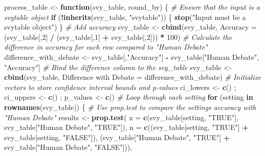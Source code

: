 \documentclass[
]{article}
\newenvironment{Shaded}{\begin{snugshade}}{\end{snugshade}}
\newcommand{\AttributeTok}[1]{\textcolor[rgb]{0.13,0.29,0.53}{#1}}
\newcommand{\CommentTok}[1]{\textcolor[rgb]{0.56,0.35,0.01}{\textit{#1}}}
\newcommand{\ControlFlowTok}[1]{\textcolor[rgb]{0.13,0.29,0.53}{\textbf{#1}}}
\newcommand{\DecValTok}[1]{\textcolor[rgb]{0.00,0.00,0.81}{#1}}
\newcommand{\FunctionTok}[1]{\textcolor[rgb]{0.13,0.29,0.53}{\textbf{#1}}}
\newcommand{\NormalTok}[1]{#1}
\newcommand{\OtherTok}[1]{\textcolor[rgb]{0.56,0.35,0.01}{#1}}
\newcommand{\SpecialCharTok}[1]{\textcolor[rgb]{0.81,0.36,0.00}{\textbf{#1}}}
\newcommand{\StringTok}[1]{\textcolor[rgb]{0.31,0.60,0.02}{#1}}
\begin{document}
\begin{Shaded}
\begin{Highlighting}[]
\NormalTok{process\_table }\OtherTok{\textless{}{-}} \ControlFlowTok{function}\NormalTok{(svy\_table, round\_by) \{}
  \CommentTok{\# Ensure that the input is a svytable object}
  \ControlFlowTok{if}\NormalTok{ (}\SpecialCharTok{!}\FunctionTok{inherits}\NormalTok{(svy\_table, }\StringTok{"svytable"}\NormalTok{)) \{}
    \FunctionTok{stop}\NormalTok{(}\StringTok{"Input must be a svytable object"}\NormalTok{)}
\NormalTok{  \}}
  \CommentTok{\# Add accuracy}
\NormalTok{  svy\_table }\OtherTok{\textless{}{-}} \FunctionTok{cbind}\NormalTok{(svy\_table, }\AttributeTok{Accuracy =}\NormalTok{ (svy\_table[,}\DecValTok{2}\NormalTok{] }\SpecialCharTok{/}\NormalTok{ (svy\_table[,}\DecValTok{1}\NormalTok{] }\SpecialCharTok{+}\NormalTok{ svy\_table[,}\DecValTok{2}\NormalTok{])) }\SpecialCharTok{*} \DecValTok{100}\NormalTok{)}
  \CommentTok{\# Calculate the difference in accuracy for each row compared to "Human Debate"}
\NormalTok{  difference\_with\_debate }\OtherTok{\textless{}{-}}\NormalTok{ svy\_table[,}\StringTok{"Accuracy"}\NormalTok{] }\SpecialCharTok{{-}}\NormalTok{ svy\_table[}\StringTok{"Human Debate"}\NormalTok{, }\StringTok{"Accuracy"}\NormalTok{]}
  \CommentTok{\# Bind the difference column to the svy\_table}
\NormalTok{  svy\_table }\OtherTok{\textless{}{-}} \FunctionTok{cbind}\NormalTok{(svy\_table, }\StringTok{\textasciigrave{}}\AttributeTok{Difference with Debate}\StringTok{\textasciigrave{}} \OtherTok{=}\NormalTok{ difference\_with\_debate)}
  \CommentTok{\# Initialize vectors to store confidence interval bounds and p{-}values}
\NormalTok{  ci\_lowers }\OtherTok{\textless{}{-}} \FunctionTok{c}\NormalTok{() ; ci\_uppers }\OtherTok{\textless{}{-}} \FunctionTok{c}\NormalTok{() ; p\_values }\OtherTok{\textless{}{-}} \FunctionTok{c}\NormalTok{()}
  \CommentTok{\# Loop through each setting}
  \ControlFlowTok{for}\NormalTok{ (setting }\ControlFlowTok{in} \FunctionTok{rownames}\NormalTok{(svy\_table)) \{}
    \CommentTok{\# Use prop.test to compare the setting\textquotesingle{}s accuracy with "Human Debate"}
\NormalTok{    results }\OtherTok{\textless{}{-}} \FunctionTok{prop.test}\NormalTok{(}
      \AttributeTok{x =} \FunctionTok{c}\NormalTok{(svy\_table[setting, }\StringTok{"TRUE"}\NormalTok{], svy\_table[}\StringTok{"Human Debate"}\NormalTok{, }\StringTok{"TRUE"}\NormalTok{]),}
      \AttributeTok{n =} \FunctionTok{c}\NormalTok{((svy\_table[setting, }\StringTok{"TRUE"}\NormalTok{] }\SpecialCharTok{+}\NormalTok{ svy\_table[setting, }\StringTok{"FALSE"}\NormalTok{]), (svy\_table[}\StringTok{"Human Debate"}\NormalTok{, }\StringTok{"TRUE"}\NormalTok{] }\SpecialCharTok{+}\NormalTok{ svy\_table[}\StringTok{"Human Debate"}\NormalTok{, }\StringTok{"FALSE"}\NormalTok{])),}

\end{Highlighting}
\end{Shaded}
\end{document}
